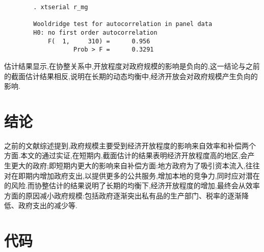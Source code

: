 \documentclass[10pt]{article}
\begin{document}
    \begin{framed}
    \begin{verbatim}
        . xtserial r_mg

        Wooldridge test for autocorrelation in panel data
        H0: no first order autocorrelation
            F(  1,     310) =      0.956
                   Prob > F =      0.3291
    \end{verbatim}
    \end{framed}

    估计结果显示,在协整关系中,开放程度对政府规模的影响是负向的,这一结论与之前的截面估计结果相反,说明在长期的动态均衡中,经济开放会对政府规模产生负向的影响.


\section{结论}
    之前的文献综述提到,政府规模主要受到经济开放程度的影响来自效率和补偿两个方面.本文的通过实证,在短期内,截面估计的结果表明经济开放程度高的地区,会产生更大的政府;即短期内更大的影响来自补偿方面:地方政府为了吸引资本流入,往往对在即期内增加政府支出,以提供更多的公共服务,增加本地的竞争力,同时应对潜在的风险.而协整估计的结果说明了长期的均衡下,经济开放程度的增加,最终会从效率方面的原因减小政府规模:包括政府逐渐突出私有品的生产部门、税率的逐渐降低、政府支出的减少等.


\clearpage
\renewcommand\refname{参考文献}
 


\clearpage
\appendix
\section{代码}
\end{document}

